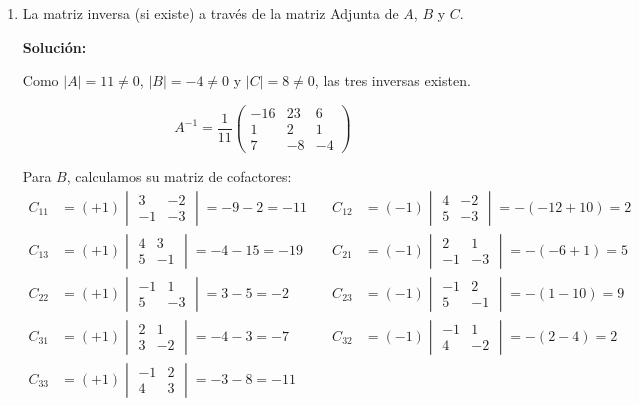 \documentclass[12pt]{article}
\newcommand{\solucion}{%
    \vspace{0.8em}%
    \textbf{Solución:}%
}
\begin{document}
\begin{enumerate}[label=\alph*.-]
    \newpage
    \item La matriz inversa (si existe) a través de la matriz Adjunta de $A$, $B$ y $C$.

    \solucion

    Como $|A|=11\neq0$, $|B|=-4\neq0$ y $|C|=8\neq0$, las tres inversas existen.

    \[
    A^{-1} = \frac{1}{11}
    \begin{pmatrix}-16&23&6\\1&2&1\\7&-8&-4\end{pmatrix}
    \]

    Para $B$, calculamos su matriz de cofactores:
    \[
    \begin{aligned}
    C_{11} &= (+1)\begin{vmatrix}3&-2\\-1&-3\end{vmatrix} = -9-2 = -11 &\quad
    C_{12} &= (-1)\begin{vmatrix}4&-2\\5&-3\end{vmatrix} = -(-12+10) = 2\\[4pt]
    C_{13} &= (+1)\begin{vmatrix}4&3\\5&-1\end{vmatrix} = -4-15 = -19 &\quad
    C_{21} &= (-1)\begin{vmatrix}2&1\\-1&-3\end{vmatrix} = -(-6+1) = 5\\[4pt]
    C_{22} &= (+1)\begin{vmatrix}-1&1\\5&-3\end{vmatrix} = 3-5 = -2 &\quad
    C_{23} &= (-1)\begin{vmatrix}-1&2\\5&-1\end{vmatrix} = -(1-10) = 9\\[4pt]
    C_{31} &= (+1)\begin{vmatrix}2&1\\3&-2\end{vmatrix} = -4-3 = -7 &\quad
    C_{32} &= (-1)\begin{vmatrix}-1&1\\4&-2\end{vmatrix} = -(2-4) = 2\\[4pt]
    C_{33} &= (+1)\begin{vmatrix}-1&2\\4&3\end{vmatrix} = -3-8 = -11 &

\end{aligned}\]
\end{enumerate}
\end{document}
